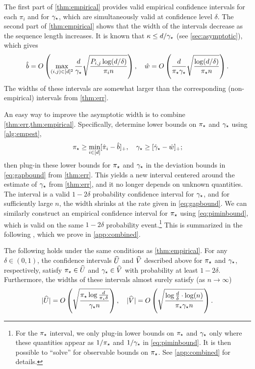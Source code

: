 The first part of \cref{thm:empirical} provides valid empirical
confidence intervals for each $\pi_i$ and for $\gamma_{\star}$, which are
simultaneously valid at confidence level $\delta$.
The second part of \cref{thm:empirical} shows that the width of the
intervals decrease as the sequence length increases.
It is known that $\kappa \le d/\gamma_{\star}$ (see \cref{sec:asymptotic}),
which gives
\[
  \hat{b}
  =
  O\left(
    \max_{(i,j) \in [d]^2}
    \frac{d}{\gamma_{\star}}
    \sqrt{\frac{P_{i,j}\log(d/\delta)}{\pi_i n}}
  \right)
  , \quad
  \hat{w}
  =
  O\left( 
    \frac{d}{\pi_{\star}\gamma_{\star}} \sqrt{\frac{\log(d/\delta)}{\pi_{\star} n}}
  \right)
  .
\] 
The widths of these intervals are somewhat larger than the corresponding
(non-empirical) intervals from \cref{thm:err}.

An easy way to improve the asymptotic width is to combine
\cref{thm:err,thm:empirical}.
Specifically, determine lower bounds on $\pi_{\star}$ and $\gamma_{\star}$ using
\cref{alg:empest},
\[
  \pi_{\star} \geq \min_{i \in [d]} [ \hat\pi_i - \hat{b} ]_+
  , \quad
  \gamma_{\star} \geq [ \hat\gamma_{\star} - \hat{w} ]_+
  ;
\]
then plug-in these lower bounds for $\pi_{\star}$ and $\gamma_{\star}$ in the
deviation bounds in \cref{eq:gapbound} from \cref{thm:err}.
This yields a new interval centered around the estimate of $\gamma_{\star}$ from
\cref{thm:err}, and it no longer depends on unknown quantities.
The interval is a valid $1-2\delta$ probability confidence interval
for $\gamma_{\star}$, and for sufficiently large $n$, the width shrinks at the
rate given in \cref{eq:gapbound}.
We can similarly construct an empirical confidence interval for
$\pi_{\star}$ using \cref{eq:piminbound}, which is valid on the same
$1-2\delta$ probability event.\footnote{%
  For the $\pi_{\star}$ interval, we only plug-in lower bounds on $\pi_{\star}$
  and $\gamma_{\star}$ only where these quantities appear as $1/\pi_{\star}$ and
  $1/\gamma_{\star}$ in \cref{eq:piminbound}.
  It is then possible to ``solve'' for observable bounds on $\pi_{\star}$.
  See \cref{app:combined} for details.%
}
This is summarized in the following , which
we prove in \cref{app:combined}.
\begin{theorem}
  \label{thm:combined}
  The following holds under the same conditions as
  \cref{thm:empirical}.
  For any $\delta \in (0,1)$, the confidence intervals $\widehat{U}$ and
  $\widehat{V}$ described above for $\pi_{\star}$ and $\gamma_{\star}$, respectively,
  satisfy $\pi_{\star} \in \widehat{U}$ and $\gamma_{\star} \in \widehat{V}$ with probability
  at least $1-2\delta$.
  Furthermore, the widths of these intervals almost surely satisfy
  (as $n \to \infty$) 
  \[
    |\widehat{U}|
    =
    O\left(
      \sqrt{\frac{\pi_{\star}\log\frac{d}{\pi_{\star}\delta}}{\gamma_{\star} n}}
    \right)
    ,
    \quad
    |\widehat{V}|
    =
    O\left(
      \sqrt{\frac{\log\frac{d}{\delta}\cdot\log(n)}{\pi_{\star}\gamma_{\star} n}}
    \right)
    .
  \]
\end{theorem}

